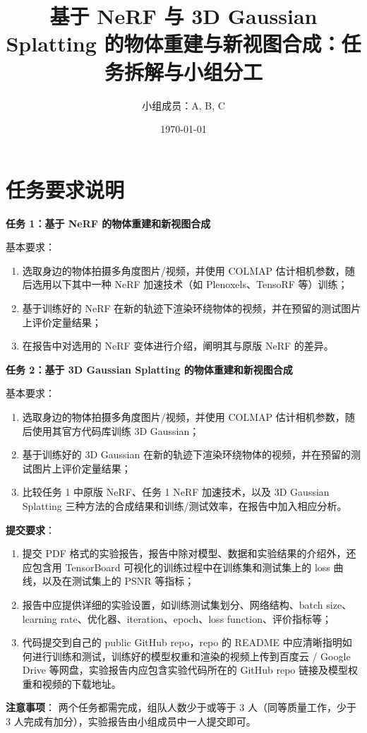 \documentclass[a4paper,12pt]{article}
\title{基于 NeRF 与 3D Gaussian Splatting 的物体重建与新视图合成：任务拆解与小组分工}
\author{小组成员：A, B, C}
\date{\today}
\begin{document}
\maketitle

\section{任务要求说明}

\begin{tcolorbox}[colback=gray!5, colframe=black, title=\textbf{课程项目任务要求}]
\textbf{任务 1：基于 NeRF 的物体重建和新视图合成}

基本要求：
\begin{enumerate}
    \item 选取身边的物体拍摄多角度图片/视频，并使用 COLMAP 估计相机参数，随后选用以下其中一种 NeRF 加速技术（如 Plenoxels、TensoRF 等）训练；
    \item 基于训练好的 NeRF 在新的轨迹下渲染环绕物体的视频，并在预留的测试图片上评价定量结果；
    \item 在报告中对选用的 NeRF 变体进行介绍，阐明其与原版 NeRF 的差异。
\end{enumerate}

\vspace{0.5em}
\textbf{任务 2：基于 3D Gaussian Splatting 的物体重建和新视图合成}

基本要求：
\begin{enumerate}
    \item 选取身边的物体拍摄多角度图片/视频，并使用 COLMAP 估计相机参数，随后使用其官方代码库训练 3D Gaussian；
    \item 基于训练好的 3D Gaussian 在新的轨迹下渲染环绕物体的视频，并在预留的测试图片上评价定量结果；
    \item 比较任务 1 中原版 NeRF、任务 1 NeRF 加速技术，以及 3D Gaussian Splatting 三种方法的合成结果和训练/测试效率，在报告中加入相应分析。
\end{enumerate}

\vspace{0.5em}
\textbf{提交要求}：
\begin{enumerate}
    \item 提交 PDF 格式的实验报告，报告中除对模型、数据和实验结果的介绍外，还应包含用 TensorBoard 可视化的训练过程中在训练集和测试集上的 loss 曲线，以及在测试集上的 PSNR 等指标；
    \item 报告中应提供详细的实验设置，如训练测试集划分、网络结构、batch size、learning rate、优化器、iteration、epoch、loss function、评价指标等；
    \item 代码提交到自己的 public GitHub repo，repo 的 README 中应清晰指明如何进行训练和测试，训练好的模型权重和渲染的视频上传到百度云 / Google Drive 等网盘，实验报告内应包含实验代码所在的 GitHub repo 链接及模型权重和视频的下载地址。
\end{enumerate}

\vspace{0.5em}
\textbf{注意事项}：
两个任务都需完成，组队人数少于或等于 3 人（同等质量工作，少于 3 人完成有加分），实验报告由小组成员中一人提交即可。
\end{tcolorbox}
\end{document}
